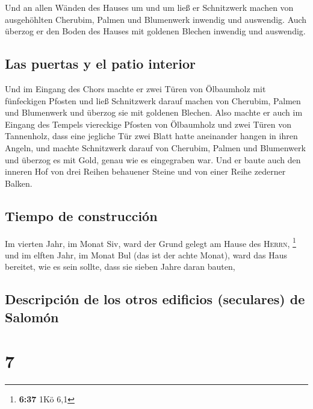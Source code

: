  Und an allen Wänden des Hauses um und um ließ er
Schnitzwerk machen von ausgehöhlten Cherubim, Palmen und Blumenwerk
inwendig und auswendig.  Auch überzog er den Boden des
Hauses mit goldenen Blechen inwendig und auswendig.

\hypertarget{las-puertas-y-el-patio-interior}{%
\subsection{Las puertas y el patio
interior}\label{las-puertas-y-el-patio-interior}}

 Und im Eingang des Chors machte er zwei Türen von
Ölbaumholz mit fünfeckigen Pfosten  und ließ Schnitzwerk
darauf machen von Cherubim, Palmen und Blumenwerk und überzog sie mit
goldenen Blechen.  Also machte er auch im Eingang des
Tempels viereckige Pfosten von Ölbaumholz  und zwei Türen
von Tannenholz, dass eine jegliche Tür zwei Blatt hatte aneinander
hangen in ihren Angeln,  und machte Schnitzwerk darauf
von Cherubim, Palmen und Blumenwerk und überzog es mit Gold, genau wie
es eingegraben war.  Und er baute auch den inneren Hof
von drei Reihen behauener Steine und von einer Reihe zederner Balken.

\hypertarget{tiempo-de-construcciuxf3n}{%
\subsection{Tiempo de construcción}\label{tiempo-de-construcciuxf3n}}

 Im vierten Jahr, im Monat Siv, ward der Grund gelegt am
Hause des \textsc{Herrn}, \footnote{\textbf{6:37} 1Kö 6,1}
 und im elften Jahr, im Monat Bul (das ist der achte
Monat), ward das Haus bereitet, wie es sein sollte, dass sie sieben
Jahre daran bauten,

\hypertarget{descripciuxf3n-de-los-otros-edificios-seculares-de-salomuxf3n}{%
\subsection{Descripción de los otros edificios (seculares) de
Salomón}\label{descripciuxf3n-de-los-otros-edificios-seculares-de-salomuxf3n}}

\hypertarget{section-6}{%
\section{7}\label{section-6}}

